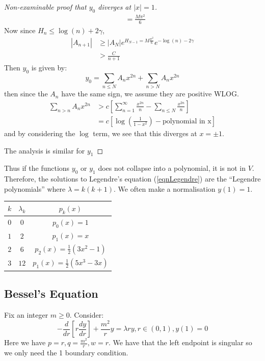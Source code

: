 \documentclass[../Main.tex]{subfiles}
\begin{document}
\begin{proof}[Non-examinable proof that $y_0$ diverges at $|x| = 1$]
\begin{align*}
        &= \frac{M\pi^2}{6}
    \end{align*}
    Now since $H_n \leq \log(n) + 2\gamma$,
    \begin{align*}
        |A_{n+1}| &\geq |A_N| e^{H_{N-1} = M\frac{\pi^2}{6}} e^{-\log(n) - 2\gamma} \\
        &> \frac{C}{n+1}
    \end{align*}       
    Then $y_0$ is given by:
    \begin{equation*}
        y_0 = \sum_{n \leq N} A_n x^{2n} + \sum_{n > N} A_nx^{2n}
    \end{equation*}
    then since the $A_n$ have the same sign, we assume they are positive WLOG.
    \begin{align*}
        \sum_{n > n} A_n x^{2n} &> c\left[\sum_{n=1}^\infty \frac{x^{2n}}{n} - \sum_{n \leq N}  \frac{x^{2n}}{n}\right] \\
        &= c\left[\log\left(\frac{1}{1-x^2}\right) - \text{polynomial in x}\right]
    \end{align*}
    and by considering the $\log$ term, we see that this diverges at $x = \pm 1$.

    The analysis is similar for $y_1$
\end{proof}
Thus if the functions $y_0$ or $y_1$ does not collapse into a polynomial, it is not in $V$. Therefore, the solutions to Legendre's equation (\ref{eqnLegendre}) are the ``Legendre polynomials'' where $\lambda = k(k+1)$. We often make a normalisation $y(1) = 1$.

\begin{tabular}{|c|c|c|}
    \hline
    $k$ & $\lambda_k$ & $p_k(x)$ \\
    \hline
    $0$ & $0$ & $p_0(x) = 1$ \\
    $1$ & $2$ & $p_1(x) = x$ \\
    $2$ & $6$ & $p_2(x) = \frac12(3x^2-1)$ \\
    $3$ & $12$ & $p_1(x) = \frac12(5x^3-3x)$ \\
    \hline
\end{tabular}
\subsection{Bessel's Equation}
Fix an integer $m \geq 0$. Consider:
\begin{equation}
    -\frac{d}{dr} \left[r \frac{dy}{dr}\right] + \frac{m^2}{r}y = \lambda r y, r \in (0, 1), y(1) = 0
    \label{eqnBesselSL}
\end{equation}
Here we have $p = r, q = \frac{m^2}{r}, w = r$. We have that the left endpoint is singular so we only need the 1 boundary condition.
\end{document}
